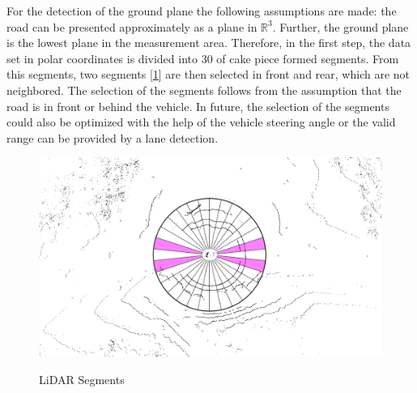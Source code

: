 \documentclass[11pt,oneside,openright]{mpreport}
\begin{document}

For the detection of the ground plane the following assumptions are made: the road can be presented approximately as a plane in $\mathbb{R}^3$.
Further, the ground plane is the lowest plane in the measurement area. Therefore, in the first step, the data set in polar coordinates is divided into 30 of cake piece formed segments.
From this segments, two segments [\cref{segments}] are then selected in front and rear, which are not neighbored. The selection of the segments follows from the assumption
that the road is in front or behind the vehicle. In future, the selection of the segments could also be optimized with the help of the vehicle steering angle 
or the valid range can be provided by a lane detection.

\begin{figure}[!ht]
\caption{LiDAR Segments}
\includegraphics[width=\textwidth]{bilder/segments.png}
\label{segments}
\end{figure}
\end{document}
